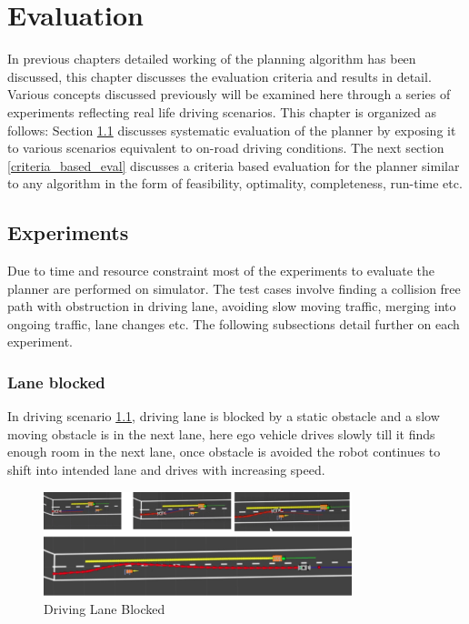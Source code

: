 \chapter{Evaluation}
\label{evaluation}
In previous chapters detailed working of the planning algorithm has been discussed, this chapter discusses the evaluation criteria and results in detail. Various concepts discussed previously will be examined here through a series of experiments reflecting real life driving scenarios. This chapter is organized as follows: Section \ref{experiments} discusses systematic evaluation of the planner by exposing it to various scenarios equivalent to on-road driving conditions. The next section \ref{criteria_based_eval} discusses a criteria based evaluation for the planner similar to any algorithm in the form of feasibility, optimality, completeness, run-time etc.

\section{Experiments}\label{experiments}
Due to time and resource constraint most of the experiments to evaluate the planner are performed on simulator. The test cases involve finding a collision free path with obstruction in driving lane, avoiding slow moving traffic, merging into ongoing traffic, lane changes etc. The following subsections detail further on each experiment. 

\subsection{Lane blocked}
In driving scenario  \ref{lane_blocked_1}, driving lane is blocked by a static obstacle and a slow moving obstacle is in the next lane, here ego vehicle drives slowly till it finds enough room in the next lane, once obstacle is avoided the robot continues to shift into intended lane and drives with increasing speed. 

\begin{figure}[h]
    \centering
    \includegraphics[width=0.8\textwidth]{Images/evaluation/lane_blocked1.jpg}
    \caption{Driving Lane Blocked}
    \label{lane_blocked_1}
\end{figure}

